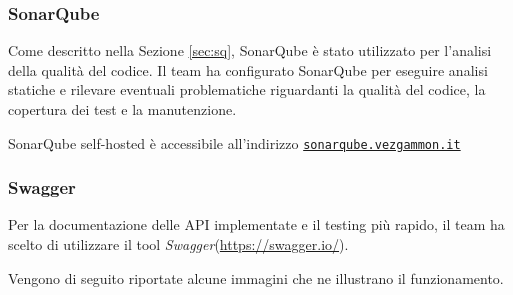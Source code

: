 \documentclass{article}
\begin{document}
\subsubsection{SonarQube}
Come descritto nella Sezione \ref{sec:sq}, SonarQube è stato utilizzato per l'analisi della qualità del codice. Il team ha 
configurato SonarQube per eseguire analisi statiche e rilevare eventuali problematiche riguardanti la qualità del codice, 
la copertura dei test e la manutenzione.

SonarQube self-hosted è accessibile all'indirizzo \href{https://sonarqube.vezgammon.it}{\texttt{sonarqube.vezgammon.it}}

\newpage

\subsubsection{Swagger}

Per la documentazione delle API implementate e il testing più rapido, il team ha scelto di utilizzare il tool 
\textit{Swagger}(\url{https://swagger.io/}).

Vengono di seguito riportate alcune immagini che ne illustrano il funzionamento.
\end{document}
